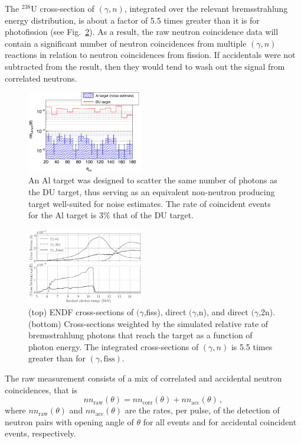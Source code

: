 \documentclass[%
 reprint,
 amsmath,amssymb,
 aps,
 nofootinbib
]{revtex4-1}
\begin{document}
The $^{238}$U cross-section of $(\gamma, n)$, integrated over the relevant bremsstrahlung energy distribution, is about a factor of 5.5 times greater than it is for photofission (see Fig.~\ref{fig:CrossSection}).
As a result, the raw neutron coincidence data will contain a significant number of neutron coincidences from multiple $(\gamma, n)$ reactions in relation to neutron coincidences from fission.
If accidentals were not subtracted from the result, then they would tend to wash out the signal from correlated neutrons. 
\begin{figure}[]
\centering
    \includegraphics[width=0.45\textwidth]{Noise.png}
    \caption{An Al target was designed to scatter the same number of photons as the DU target, thus serving as an equivalent non-neutron producing target well-suited for noise estimates.
    The rate of coincident events for the Al target is 3\% that of the DU target. 
        }
    \label{fig:Noise}
\end{figure}
\begin{figure}[]
\centering
    \includegraphics[width=0.45\textwidth]{CrossSections.png}
    \caption{(top) ENDF cross-sections of $(\gamma$,fiss), direct $(\gamma$,n), and direct $(\gamma$,2n).
    (bottom) Cross-sections weighted by the simulated relative rate of bremsstrahlung photons that reach the target as a function of photon energy. The integrated cross-sections of $(\gamma, n)$ is 5.5 times greater than for $(\gamma, \text{fiss})$. }
    \label{fig:CrossSection}
\end{figure}

The raw measurement consists of a mix of correlated and accidental neutron coincidences, that is
\begin{equation}
\label{eq:corr_uncorr}
nn_{\text{raw}}(\theta)= nn_{\text{corr}}(\theta) + nn_{\text{acc}}(\theta) \, ,
\end{equation}
where $nn_{\text{raw}}(\theta)$ and $nn_{\text{acc}}(\theta)$ are the rates, per pulse, of the detection of neutron pairs with opening angle of $\theta$ for all events and for accidental coincident events, respectively.
\end{document}
